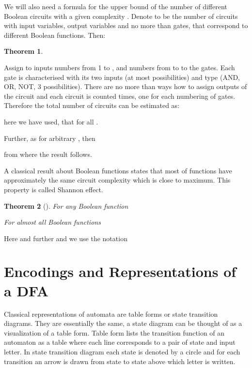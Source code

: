 \documentclass[copyright, creativecommons]{eptcs}
\newcommand{\qed}{}
\newtheorem{theorem}{Theorem}[section]
\newenvironment{proof}[1][Proof]{\begin{trivlist}
\item[\hskip \labelsep {\bfseries #1}]}{\end{trivlist}}
\begin{document}
We will also need a formula for the upper bound of the number of different Boolean circuits with a given complexity .
Denote  to be the number of circuits with  input variables,
 output variables and no more than  gates, that correspond to different Boolean
functions. Then:
\begin{theorem}
\label{shemuSkaits}

\end{theorem}
\begin{proof}
Assign to inputs numbers from 1 to , and numbers from  to  to the gates. Each gate is characterised
with its two inputs (at most  possibilities) and type (AND, OR, NOT, 3 possibilities). There are no more
than  ways how to assign outputs of the circuit and each circuit is counted  times, one for each
numbering of gates. Therefore the total number of circuits can be estimated as:

here we have used, that  for all .

Further, as  for arbitrary , then

from where the result follows.
\qed
\end{proof}

A classical result about Boolean functions states that most of functions  have
approximately the same circuit complexity which is close to maximum. This property is called Shannon effect.
\begin{theorem}[\cite{L84}]
\label{ShTeorema}
For any Boolean function 

For almost all  Boolean functions 

\end{theorem}
Here and further  and we use the notation












\section{Encodings and Representations of a DFA}
\label{3nod}
Classical representations of automata are table forms or state transition diagrams. They are essentially
the same, a state diagram can be thought of as a visualization of a table form. Table form lists
the transition function of an automaton as a table where each line corresponds to a pair of state and input letter.
In state transition diagram each state is denoted by a circle and for each
transition  an arrow is drawn from state  to state  above which letter  is written.
\end{document}
